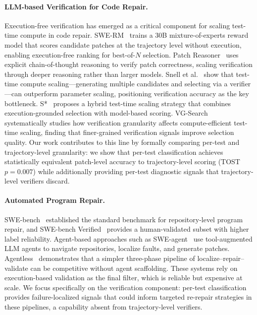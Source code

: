 \paragraph{LLM-based Verification for Code Repair.}
Execution-free verification has emerged as a critical component for scaling test-time compute in code repair.
SWE-RM~\cite{zhang2025swerm} trains a 30B mixture-of-experts reward model that scores candidate patches at the trajectory level without execution, enabling execution-free ranking for best-of-$N$ selection.
Patch Reasoner~\cite{wu2025patchreasoner} uses explicit chain-of-thought reasoning to verify patch correctness, scaling verification through deeper reasoning rather than larger models.
Snell et al.~\cite{snell2024scaling} show that test-time compute scaling---generating multiple candidates and selecting via a verifier---can outperform parameter scaling, positioning verification accuracy as the key bottleneck.
S*~\cite{zhang2025sstar} proposes a hybrid test-time scaling strategy that combines execution-grounded selection with model-based scoring.
VG-Search~\cite{wang2025vgsearch} systematically studies how verification granularity affects compute-efficient test-time scaling, finding that finer-grained verification signals improve selection quality.
Our work contributes to this line by formally comparing per-test and trajectory-level granularity: we show that per-test classification achieves statistically equivalent patch-level accuracy to trajectory-level scoring (TOST $p = 0.007$) while additionally providing per-test diagnostic signals that trajectory-level verifiers discard.

\paragraph{Automated Program Repair.}
SWE-bench~\cite{jimenez2024swebench} established the standard benchmark for repository-level program repair, and SWE-bench Verified~\cite{chowdhury2024swebenchverified} provides a human-validated subset with higher label reliability.
Agent-based approaches such as SWE-agent~\cite{yang2024sweagent} use tool-augmented LLM agents to navigate repositories, localize faults, and generate patches.
Agentless~\cite{xia2024agentless} demonstrates that a simpler three-phase pipeline of localize--repair--validate can be competitive without agent scaffolding.
These systems rely on execution-based validation as the final filter, which is reliable but expensive at scale.
We focus specifically on the verification component: per-test classification provides failure-localized signals that could inform targeted re-repair strategies in these pipelines, a capability absent from trajectory-level verifiers.

